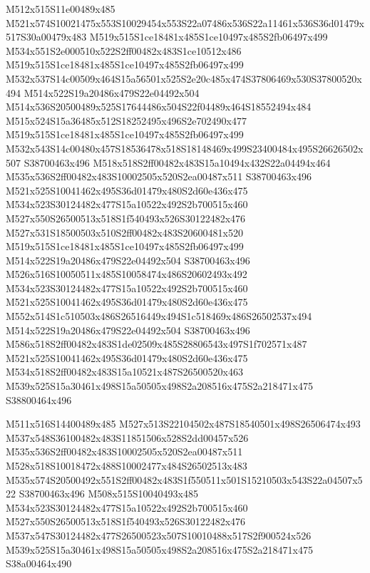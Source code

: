 \documentclass{article}
\begin{document}
\begin{multicols}{2}
M512x515S11e00489x485 M521x574S10021475x553S10029454x553S22a07486x536S22a11461x536S36d01479x517S30a00479x483 M519x515S1ce18481x485S1ce10497x485S2fb06497x499 M534x551S2e000510x522S2ff00482x483S1ce10512x486 M519x515S1ce18481x485S1ce10497x485S2fb06497x499 M532x537S14c00509x464S15a56501x525S2e20c485x474S37806469x530S37800520x494 M514x522S19a20486x479S22e04492x504 M514x536S20500489x525S17644486x504S22f04489x464S18552494x484 M515x524S15a36485x512S18252495x496S2e702490x477 M519x515S1ce18481x485S1ce10497x485S2fb06497x499 M532x543S14c00480x457S18536478x518S18148469x499S23400484x495S26626502x507 S38700463x496 M518x518S2ff00482x483S15a10494x432S22a04494x464 M535x536S2ff00482x483S10002505x520S2ea00487x511 S38700463x496 M521x525S10041462x495S36d01479x480S2d60e436x475 M534x523S30124482x477S15a10522x492S2b700515x460 M527x550S26500513x518S1f540493x526S30122482x476 M527x531S18500503x510S2ff00482x483S20600481x520 M519x515S1ce18481x485S1ce10497x485S2fb06497x499 M514x522S19a20486x479S22e04492x504 S38700463x496 M526x516S10050511x485S10058474x486S20602493x492 M534x523S30124482x477S15a10522x492S2b700515x460 M521x525S10041462x495S36d01479x480S2d60e436x475 M552x514S1c510503x486S26516449x494S1c518469x486S26502537x494 M514x522S19a20486x479S22e04492x504 S38700463x496 M586x518S2ff00482x483S1de02509x485S28806543x497S1f702571x487 M521x525S10041462x495S36d01479x480S2d60e436x475 M534x518S2ff00482x483S15a10521x487S26500520x463 M539x525S15a30461x498S15a50505x498S2a208516x475S2a218471x475 S38800464x496

M511x516S14400489x485 M527x513S22104502x487S18540501x498S26506474x493 M537x548S36100482x483S11851506x528S2dd00457x526 M535x536S2ff00482x483S10002505x520S2ea00487x511 M528x518S10018472x488S10002477x484S26502513x483 M535x574S20500492x551S2ff00482x483S1f550511x501S15210503x543S22a04507x522 S38700463x496 M508x515S10040493x485 M534x523S30124482x477S15a10522x492S2b700515x460 M527x550S26500513x518S1f540493x526S30122482x476 M537x547S30124482x477S26500523x507S10010488x517S2f900524x526 M539x525S15a30461x498S15a50505x498S2a208516x475S2a218471x475 S38a00464x490


\end{multicols}
\end{document}
